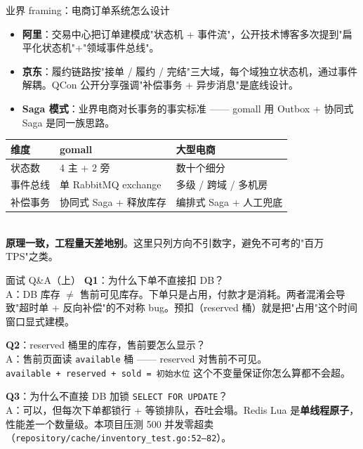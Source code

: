\begin{frame}{业界 framing：电商订单系统怎么设计}
\begin{itemize}
  \item \textbf{阿里}：交易中心把订单建模成"状态机 + 事件流"，公开技术博客多次提到"扁平化状态机"+"领域事件总线"。
  \item \textbf{京东}：履约链路按"接单 / 履约 / 完结"三大域，每个域独立状态机，通过事件解耦。QCon 公开分享强调"补偿事务 + 异步消息"是底线设计。
  \item \textbf{Saga 模式}：业界电商对长事务的事实标准 —— gomall 用 Outbox + 协同式 Saga 是同一族思路。
\end{itemize}
\vspace{2mm}
\begin{tabular}{@{}lll@{}}
\toprule
维度 & gomall & 大型电商 \\
\midrule
状态数 & 4 主 + 2 旁 & 数十个细分 \\
事件总线 & 单 RabbitMQ exchange & 多级 / 跨域 / 多机房 \\
补偿事务 & 协同式 Saga + 释放库存 & 编排式 Saga + 人工兜底 \\
\bottomrule
\end{tabular}
\vspace{1mm}\\
\small \textbf{原理一致，工程量天差地别}。这里只列方向不引数字，避免不可考的"百万 TPS"之类。
\end{frame}

\appendix

\begin{frame}{面试 Q\&A（上）}
\textbf{Q1}：为什么下单不直接扣 DB？\\
\hspace{4mm}\small A：DB 库存 $\ne$ 售前可见库存。下单只是占用，付款才是消耗。两者混淆会导致"超时单 + 反向补偿"的不对称 bug。预扣（reserved 桶）就是把"占用"这个时间窗口显式建模。

\vspace{2mm}
\textbf{Q2}：reserved 桶里的库存，售前要怎么显示？\\
\hspace{4mm}\small A：售前页面读 \texttt{available} 桶 —— reserved 对售前不可见。\\\texttt{available + reserved + sold = 初始水位} 这个不变量保证你怎么算都不会超。

\vspace{2mm}
\textbf{Q3}：为什么不直接 DB 加锁 \texttt{SELECT FOR UPDATE}？\\
\hspace{4mm}\small A：可以，但每次下单都锁行 + 等锁排队，吞吐会塌。Redis Lua 是\textbf{单线程原子}，性能差一个数量级。本项目压测 500 并发零超卖（\texttt{repository/cache/inventory\_test.go:52--82}）。
\end{frame}

